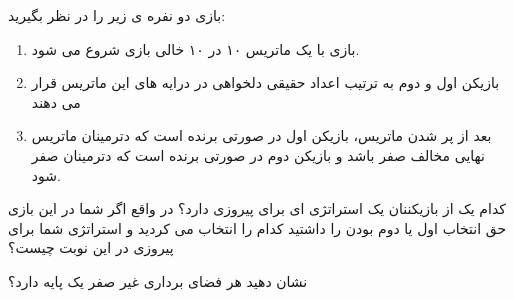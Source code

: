 \documentclass{article}
\begin{document}
\begin{enumerate}[label=\alph*)]
   بازی دو نفره ی زیر را در نظر بگیرید:
   \begin{enumerate}
   	\item 
   	بازی با یک ماتریس ۱۰ در ۱۰ خالی بازی شروع می شود.
   	\item
   	بازیکن اول و دوم به ترتیب اعداد حقیقی دلخواهی در درایه های این ماتریس قرار می دهند 
   	\item
   	بعد از پر شدن ماتریس، بازیکن اول در صورتی برنده است که دترمینان ماتریس نهایی مخالف صفر باشد و بازیکن دوم در صورتی برنده است که دترمینان صفر شود.
   \end{enumerate}
   کدام یک از بازیکننان یک استراتژی ای برای پیروزی دارد؟ در واقع اگر شما در این بازی حق انتخاب اول یا دوم بودن را داشتید کدام را انتخاب می کردید و استراتژی شما برای پیروزی در این نوبت چیست؟
   
\end{enumerate}
  
   نشان دهید هر فضای برداری غیر صفر یک پایه دارد؟

   
   
\end{document}
